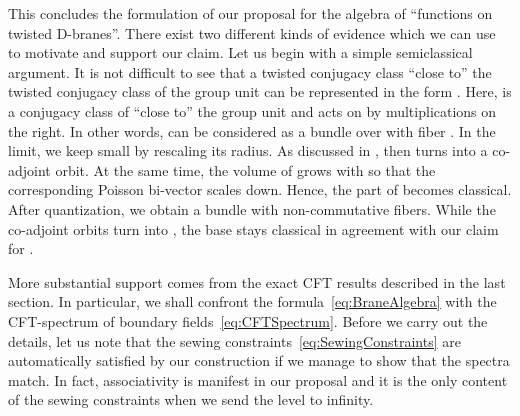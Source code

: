 \documentclass[12pt,a4paper]{article}
\def\iG{G^\omega} %
\def\Hom{{\text{\rm Hom}}} %
\begin{document}
This concludes the formulation of our proposal for the algebra 
of ``functions on twisted D-branes''. There exist two different
kinds of evidence which we can use to motivate and support our 
claim. Let us begin with a simple semiclassical argument. It 
is not difficult to see that a twisted conjugacy class ``close to'' 
the twisted conjugacy class of the group unit can be represented 
in the form \myHighlight{$C^\omega = G \times_{\iG} C'$}\coordHE{}. Here, \coordHE{} is a 
conjugacy class of \myHighlight{$\iG$}\coordHE{} ``close to'' the group unit and \myHighlight{$\iG$}\coordHE{} 
acts on \coordHE{} by multiplications on the right. In other words, 
\coordHE{} can be considered as a bundle over \myHighlight{$G/\iG$}\coordHE{} with 
fiber \coordHE{}. In the \coordHE{} limit, we keep \coordHE{} small by
rescaling its radius. As discussed in \cite{Alekseev:1999bs}, 
\coordHE{} then turns into a co-adjoint orbit. At the same time, the 
volume of \myHighlight{$G/\iG$}\coordHE{} grows with \coordHE{} so that the corresponding Poisson 
bi-vector scales down. Hence, the \myHighlight{$G/\iG$}\coordHE{} part of \coordHE{} 
becomes classical. After quantization, we obtain a bundle with 
non-commutative fibers. While the co-adjoint orbits turn 
into \myHighlight{$\Hom(V_a,V_a)$}\coordHE{}, the base \myHighlight{$G/\iG$}\coordHE{} stays classical in 
agreement with our claim for \coordHE{}.  
\smallskip

More substantial support comes from the exact CFT results 
described in the last section. In particular, we shall 
confront the formula~\eqref{eq:BraneAlgebra} with the 
CFT-spectrum of boundary fields~\eqref{eq:CFTSpectrum}. 
Before we carry out the details, let us note that the  
sewing constraints~\eqref{eq:SewingConstraints} are 
automatically satisfied by our construction if we manage
to show that the spectra match. In fact, associativity is
manifest in our proposal and it is the only content of the 
sewing constraints when we send the level \coordHE{} to infinity. 
\smallskip
\end{document}
